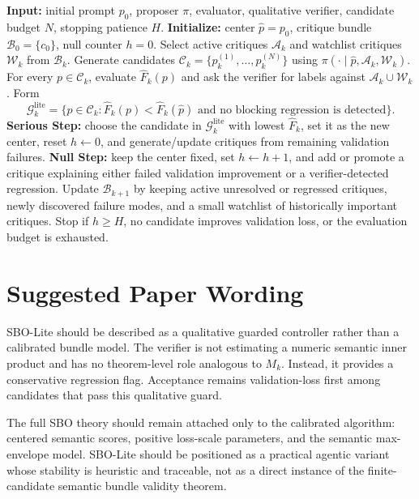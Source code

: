 \documentclass{article}
\begin{document}
\begin{algorithm}[H]
\caption{SBO-Lite With Qualitative Regression Guard}
\label{alg:sbo_lite_guard}
\begin{algorithmic}[1]
\STATE \textbf{Input:} initial prompt \(p_0\), proposer \(\pi\), evaluator,
qualitative verifier, candidate budget \(N\), stopping patience \(H\).
\STATE \textbf{Initialize:} center \(\hat p=p_0\), critique bundle
\(\mathcal B_0=\{c_0\}\), null counter \(h=0\).
    \STATE Select active critiques \(\mathcal A_k\) and watchlist critiques
    \(\mathcal W_k\) from \(\mathcal B_k\).
    \STATE Generate candidates
    \(\mathcal C_k=\{p_k^{(1)},\ldots,p_k^{(N)}\}\) using
    \(\pi(\cdot\mid \hat p,\mathcal A_k,\mathcal W_k)\).
    \STATE For every \(p\in\mathcal C_k\), evaluate \(\widehat F_k(p)\) and
    ask the verifier for labels against \(\mathcal A_k\cup\mathcal W_k\).
    \STATE Form
    \[
        \mathcal G_k^{\mathrm{lite}}
        =
        \{p\in\mathcal C_k:
        \widehat F_k(p)<\widehat F_k(\hat p)
        \text{ and no blocking regression is detected}\}.
    \]
        \STATE \textbf{Serious Step:} choose the candidate in
        \(\mathcal G_k^{\mathrm{lite}}\) with lowest \(\widehat F_k\), set it
        as the new center, reset \(h\leftarrow0\), and generate/update
        critiques from remaining validation failures.
    \ELSE
        \STATE \textbf{Null Step:} keep the center fixed, set
        \(h\leftarrow h+1\), and add or promote a critique explaining either
        failed validation improvement or a verifier-detected regression.
    \ENDIF
    \STATE Update \(\mathcal B_{k+1}\) by keeping active unresolved or
    regressed critiques, newly discovered failure modes, and a small watchlist
    of historically important critiques.
    \STATE Stop if \(h\ge H\), no candidate improves validation loss, or the
    evaluation budget is exhausted.
\ENDFOR
\end{algorithmic}
\end{algorithm}

\section{Suggested Paper Wording}

SBO-Lite should be described as a qualitative guarded controller rather than a
calibrated bundle model. The verifier is not estimating a numeric semantic
inner product and has no theorem-level role analogous to \(M_k\). Instead, it
provides a conservative regression flag. Acceptance remains validation-loss
first among candidates that pass this qualitative guard.

The full SBO theory should remain attached only to the calibrated algorithm:
centered semantic scores, positive loss-scale parameters, and the semantic
max-envelope model. SBO-Lite should be positioned as a practical agentic
variant whose stability is heuristic and traceable, not as a direct instance of
the finite-candidate semantic bundle validity theorem.
\end{document}
